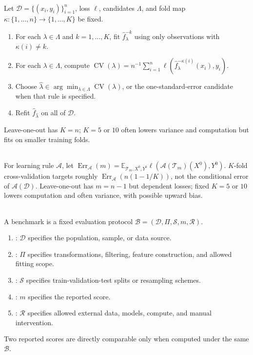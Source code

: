 \begin{method} \label{meth:sl-k-fold-cross-validation} \\
Let $\mathcal{D}=\{(x_i,y_i)\}_{i=1}^n$, loss $\ell$, candidates $\Lambda$, and fold map $\kappa:\{1,\ldots,n\}\to\{1,\ldots,K\}$ be fixed.
\begin{enumerate}[label=(\roman*)]
\setlength{\itemsep}{0pt}
\item For each $\lambda\in\Lambda$ and $k=1,\ldots,K$, fit $\widehat f_\lambda^{-k}$ using only observations with $\kappa(i)\ne k$.
\item For each $\lambda\in\Lambda$, compute $\operatorname{CV}(\lambda)=n^{-1}\sum_{i=1}^n\ell(\widehat f_\lambda^{-\kappa(i)}(x_i),y_i)$.
\item Choose $\widehat\lambda\in\arg\min_{\lambda\in\Lambda}\operatorname{CV}(\lambda)$, or the one-standard-error candidate when that rule is specified.
\item Refit $\widehat f_{\widehat\lambda}$ on all of $\mathcal{D}$.
\end{enumerate}
Leave-one-out has $K=n$; $K=5$ or $10$ often lowers variance and computation but fits on smaller training folds.
\end{method}

\begin{remark} \label{rem:sl-cv-expected-not-conditional-error} \\
For learning rule $\mathcal{A}$, let $\operatorname{Err}_{\mathcal{A}}(m)=\mathbb{E}_{\mathcal{T}_m,X^0,Y^0}\ell(\mathcal{A}(\mathcal{T}_m)(X^0),Y^0)$. $K$-fold cross-validation targets roughly $\operatorname{Err}_{\mathcal{A}}(n(1-1/K))$, not the conditional error of $\mathcal{A}(\mathcal{D})$. Leave-one-out has $m=n-1$ but dependent losses; fixed $K=5$ or $10$ lowers computation and often variance, with possible upward bias.
\end{remark}

\begin{definition} \label{def:sl-benchmark} \\
A benchmark is a fixed evaluation protocol $\mathcal{B}=(\mathcal{D},\Pi,\mathcal{S},m,\mathcal{R})$.
\begin{enumerate}[label=(\roman*)]
\setlength{\itemsep}{0pt}
\item {}: $\mathcal{D}$ specifies the population, sample, or data source.
\item {}: $\Pi$ specifies transformations, filtering, feature construction, and allowed fitting scope.
\item {}: $\mathcal{S}$ specifies train-validation-test splits or resampling schemes.
\item {}: $m$ specifies the reported score.
\item {}: $\mathcal{R}$ specifies allowed external data, models, compute, and manual intervention.
\end{enumerate}
Two reported scores are directly comparable only when computed under the same $\mathcal{B}$.
\end{definition}

